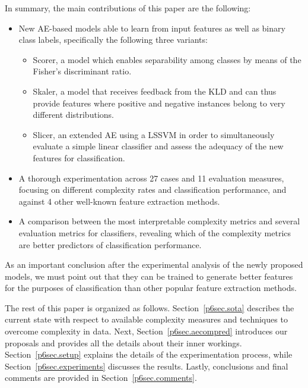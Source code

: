 In summary, the main contributions of this paper are the following:
\begin{itemize}
  \item New AE-based models able to learn from input features as well as binary class labels, specifically the following three variants:
        \begin{itemize}
          \item Scorer, a model which enables separability among classes by means of the Fisher's discriminant ratio.
          \item Skaler, a model that receives feedback from the KLD and can thus provide features where positive and negative instances belong to very different distributions.
          \item Slicer, an extended AE using a LSSVM in order to simultaneously evaluate a simple linear classifier and assess the adequacy of the new features for classification.
        \end{itemize}
  \item A thorough experimentation across 27 cases and 11 evaluation measures, focusing on different complexity rates and classification performance, and against 4 other well-known feature extraction methods.
  \item A comparison between the most interpretable complexity metrics and several evaluation metrics for classifiers, revealing which of the complexity metrics are better predictors of classification performance.
\end{itemize}

As an important conclusion after the experimental analysis of the newly proposed models, we must point out that they can be trained to generate better features for the purposes of classification than other popular feature extraction methods.

The rest of this paper is organized as follows. Section~\ref{p6sec.sota} describes the current state with respect to available complexity measures and techniques to overcome complexity in data. Next, Section~\ref{p6sec.aecompred} introduces our proposals and provides all the details about their inner workings. Section~\ref{p6sec.setup} explains the details of the experimentation process, while Section~\ref{p6sec.experiments} discusses the results. Lastly, conclusions and final comments are provided in Section~\ref{p6sec.comments}.



